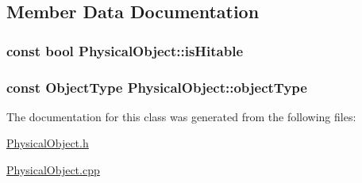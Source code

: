 \subsection{Member Data Documentation}
\hypertarget{classPhysicalObject_a5afc803dac6415f86fcda81983b75e41}{
\subsubsection[{is\-Hitable}]{\setlength{\rightskip}{0pt plus 5cm}const bool Physical\-Object\-::is\-Hitable}}\label{classPhysicalObject_a5afc803dac6415f86fcda81983b75e41}
\hypertarget{classPhysicalObject_a59060233e54004b24fc03ed786b46dd3}{
\subsubsection[{object\-Type}]{\setlength{\rightskip}{0pt plus 5cm}const {\bf Object\-Type} Physical\-Object\-::object\-Type}}\label{classPhysicalObject_a59060233e54004b24fc03ed786b46dd3}


The documentation for this class was generated from the following files\-:\begin{DoxyCompactItemize}
\item 
\hyperlink{PhysicalObject_8h}{Physical\-Object.\-h}\item 
\hyperlink{PhysicalObject_8cpp}{Physical\-Object.\-cpp}\end{DoxyCompactItemize}
